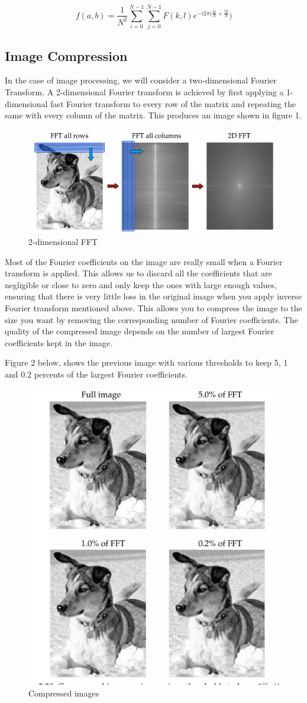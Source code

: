 \documentclass[11pt]{amsart}
\theoremstyle{definition}
\theoremstyle{remark}
\numberwithin{equation}{section}
\begin{document}
\[
	f(a,b) = \frac{1}{N^{2}} \sum_{i=0}^{N-1} \sum_{j =0}^{N-1} F(k,l) e^{-i2\pi(\frac{ki}{N} +\frac{lg}{N}})
\]

\subsection {Image Compression}
In the case of image processing, we will consider a two-dimensional Fourier Transform. A 2-dimensional Fourier transform is achieved by first applying a 1-dimensional fast Fourier transform to every row of the matrix and repeating the same with every column of the matrix. This produces an image shown in figure 1.
\begin{figure} [h]
    \centering
    \includegraphics[width=0.5\linewidth]{../pictures/Screenshot 2024-05-22 111943.png}
    \caption{2-dimensional FFT}
    \label{fig:1.1}
\end{figure}

Most of the Fourier coefficients on the image are really small when a Fourier transform is applied. This allows us to discard all the coefficients that are negligible or close to zero and only keep the ones with large enough values, ensuring that there is very little loss in the original image when you apply inverse Fourier transform mentioned above. This allows you to compress the image to the size you want by removing the corresponding number of Fourier coefficients. The quality of the compressed image depends on the number of largest Fourier coefficients kept in the image. 

Figure 2 below, shows the previous image with various thresholds to keep 5, 1 and 0.2 percents of the largest Fourier coefficients.
 \begin{figure} [h]
     \centering
     \includegraphics[width=0.5\linewidth]{../pictures/Screenshot 2024-05-22 122030.png}
     \caption{Compressed images} \label{fig:2}
 \end{figure}
\end{document}
